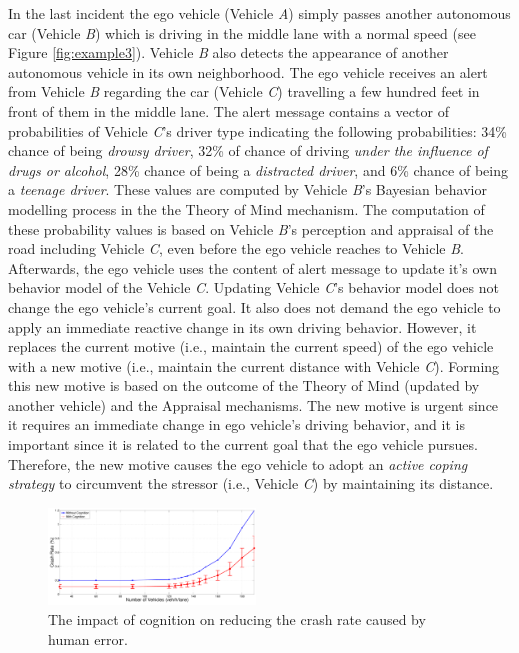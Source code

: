 \documentclass[journal, 11pt]{IEEEtran}
\begin{document}
In the last incident the ego vehicle (Vehicle \textit{A}) simply passes another
autonomous car (Vehicle \textit{B}) which is driving in the middle lane with a
normal speed (see Figure \ref{fig:example3}). Vehicle \textit{B} also detects
the appearance of another autonomous vehicle in its own neighborhood. The ego
vehicle receives an alert from Vehicle \textit{B} regarding the car (Vehicle
\textit{C}) travelling a few hundred feet in front of them in the middle lane.
The alert message contains a vector of probabilities of Vehicle \textit{C}'s
driver type indicating the following probabilities: 34\% chance of being
\textit{drowsy driver}, 32\% of chance of driving \textit{under the influence of
drugs or alcohol}, 28\% chance of being a \textit{distracted driver}, and 6\%
chance of being a \textit{teenage driver}. These values are computed by 
Vehicle \textit{B}'s Bayesian behavior modelling process in the the Theory of
Mind mechanism. The computation of these probability values is based on Vehicle
\textit{B}'s perception and appraisal of the road including Vehicle \textit{C},
even before the ego vehicle reaches to Vehicle \textit{B}. Afterwards, the ego
vehicle uses the content of alert message to update it's own behavior model
of the Vehicle \textit{C}. Updating Vehicle \textit{C}'s behavior model does not
change the ego vehicle's current goal. It also does not demand the ego vehicle
to apply an immediate reactive change in its own driving behavior. However, it
replaces the current motive (i.e., maintain the current speed) of the ego
vehicle with a new motive (i.e., maintain the current distance with Vehicle
\textit{C}). Forming this new motive is based on the outcome of the Theory of
Mind (updated by another vehicle) and the Appraisal mechanisms. The new motive
is urgent since it requires an immediate change in ego vehicle's driving
behavior, and it is important since it is related to the current goal that the
ego vehicle pursues. Therefore, the new motive causes the ego vehicle to adopt
an \textit{active coping strategy} to circumvent the stressor (i.e., Vehicle
\textit{C}) by maintaining its distance.

\begin{figure}[!t]
  \centering
  \vspace*{1mm}
  \includegraphics[width=0.49\textwidth]{figs/errorPlot.pdf}
  \caption{{\fontsize{10}{10}\selectfont The impact of cognition on reducing the
  crash rate caused by human error.}}
  \label{fig:errorPlot}
  \vspace*{-6mm}
\end{figure}
\end{document}
